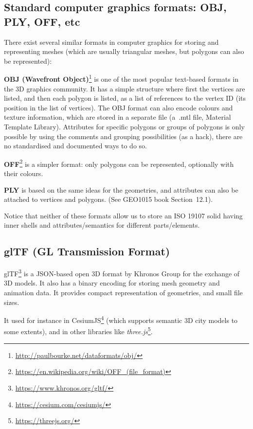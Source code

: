 \subsection{Standard computer graphics formats: OBJ, PLY, OFF, etc}

There exist several similar formats in computer graphics for storing and representing meshes (which are usually triangular meshes, but polygons can also be represented):

\textbf{OBJ (Wavefront Object)}\footnote{\url{http://paulbourke.net/dataformats/obj/}} is one of the most popular text-based formats in the 3D graphics community.
It has a simple structure where first the vertices are listed, and then each polygon is listed, as a list of references to the vertex ID (its position in the list of vertices).
The OBJ format can also encode colours and texture information, which are stored in a separate file (a~.mtl file, Material Template Library).
Attributes for specific polygons or groups of polygons is only possible by using the comments and grouping possibilities (as a hack), there are no standardised and documented ways to do so.

\textbf{OFF}\footnote{\url{https://en.wikipedia.org/wiki/OFF_(file_format)}} is a simpler format: only polygons can be represented, optionally with their colours.

\textbf{PLY} is based on the same ideas for the geometries, and attributes can also be attached to vertices and polygons. (See GEO1015 book Section~12.1).

Notice that neither of these formats allow us to store an ISO 19107 solid having inner shells and attributes/semantics for different parts/elements.


\subsection{glTF (GL Transmission Format)}
glTF\footnote{\url{https://www.khronos.org/gltf/}} is a JSON-based open 3D format by Khronos Group for the exchange of 3D models.
It also has a binary encoding for storing mesh geometry and animation data.
It provides compact representation of geometries, and small file sizes.

It used for instance in CesiumJS\footnote{\url{https://cesium.com/cesiumjs/}} (which supports semantic 3D city models to some extents), and in other libraries like \emph{three.js}\footnote{\url{https://threejs.org/}}.



